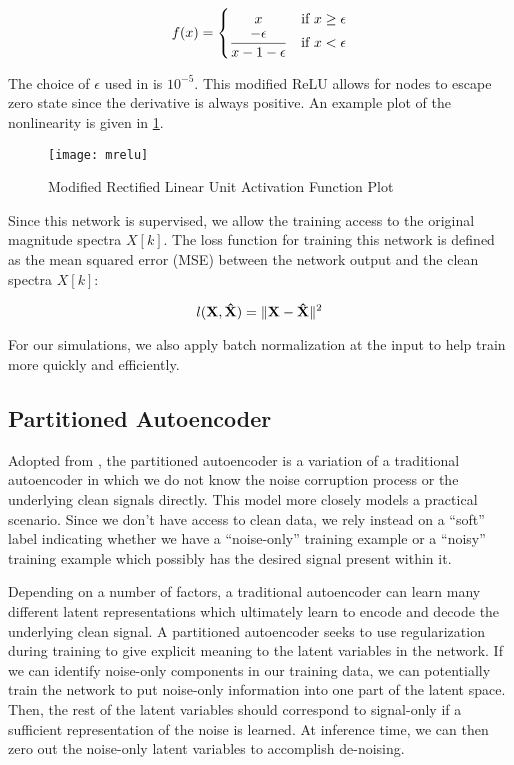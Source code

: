 \begin{equation}\label{eq:mrelu}
f(x) =
    \begin{cases}
        \hfill x \hfill & \text{if $x \ge \epsilon$}\\
        \hfill \dfrac{-\epsilon}{x-1-\epsilon} & \text{if $x < \epsilon$}
    \end{cases}
\end{equation}

The choice of $\epsilon$ used in \cite{liu2014experiments} is $10^{-5}$. This modified ReLU allows for nodes to escape zero state since the derivative is always positive. An example plot of the nonlinearity is given in \ref{fig:mrelu}.

\begin{figure}[!ht]
\centering
\texttt{[image: mrelu]}
\caption[Modified Rectified Linear Unit Activation]{Modified Rectified Linear Unit Activation Function Plot}
\label{fig:mrelu}
\end{figure}

Since this network is supervised, we allow the training access to the original magnitude spectra $X[k]$. The loss function for training this network is defined as the mean squared error (MSE) between the network output and the clean spectra $X[k]$:

\begin{equation}
l(\mathbf{X},\mathbf{\hat{X}}) = \lVert\mathbf{X}-\mathbf{\hat{X}}\rVert^{2}
\end{equation}

For our simulations, we also apply batch normalization at the input to help train more quickly and efficiently.

\subsection{Partitioned Autoencoder}

Adopted from \cite{stow}, the partitioned autoencoder is a variation of a traditional autoencoder in which we do not know the noise corruption process or the underlying clean signals directly. This model more closely models a practical scenario. Since we don't have access to clean data, we rely instead on a ``soft'' label indicating whether we have a ``noise-only'' training example or a ``noisy'' training example which possibly has the desired signal present within it.

Depending on a number of factors, a traditional autoencoder can learn many different latent representations which ultimately learn to encode and decode the underlying clean signal. A partitioned autoencoder seeks to use regularization during training to give explicit meaning to the latent variables in the network. If we can identify noise-only components in our training data, we can potentially train the network to put noise-only information into one part of the latent space. Then, the rest of the latent variables should correspond to signal-only if a sufficient representation of the noise is learned. At inference time, we can then zero out the noise-only latent variables to accomplish de-noising.

